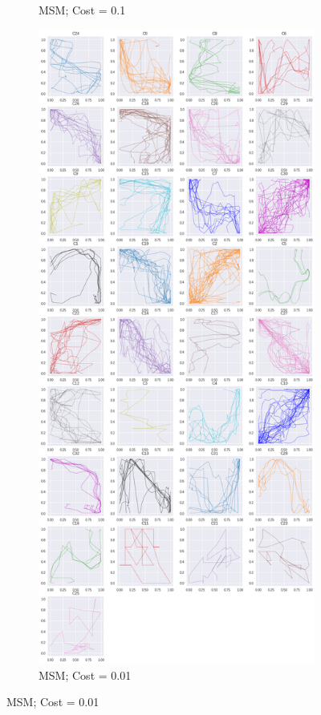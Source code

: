 \begin{figure}[h]
\begin{subfigure}[c]{0.35\linewidth}
    \caption{MSM; Cost = 0.1}
  \end{subfigure}
  \hspace{.5em}
    \begin{subfigure}[c]{0.35\linewidth}
      \includegraphics[width=\linewidth]{figs/clusters/CLU_AP_ALL[MSM;c=.01].png}
    \caption{MSM; Cost = 0.01}
  \end{subfigure}
  \hspace{.5em}
  

\end{figure}
